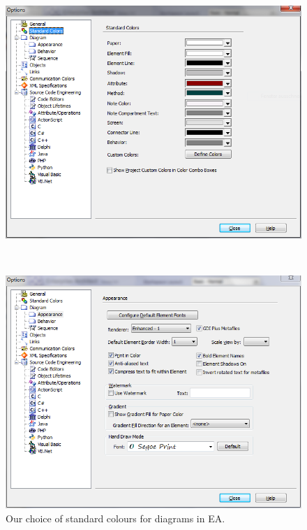 \begin{figure}[!h]
\centering
\begin{minipage}[b]{0.3\textheight}
  \centering
  \includegraphics[width=\textwidth]{pics/installationAndSetup/standardColours}
  \caption{Our choice of standard colours for diagrams in EA.}
  \label{fig_standardColoursEA}
\end{minipage}
\\
\vspace{0.5cm}
\begin{minipage}[b]{0.3\textheight}
  \centering
  \includegraphics[width=\textwidth]{pics/installationAndSetup/standardAppearance}

\end{minipage}
\end{figure}
